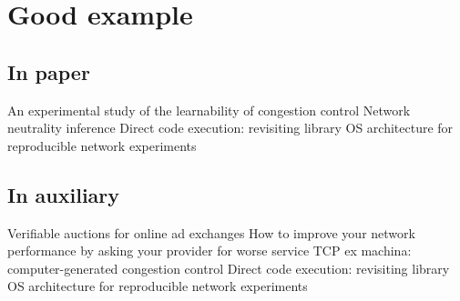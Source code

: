 \documentclass[a4paper]{SIGCOMM}
\begin{document}
\section{Good example}

\subsection{In paper}
An experimental study of the learnability of congestion control
Network neutrality inference
Direct code execution: revisiting library OS architecture for reproducible network experiments

\subsection{In auxiliary}
Verifiable auctions for online ad exchanges
How to improve your network performance by asking your provider for worse service
TCP ex machina: computer-generated congestion control
Direct code execution: revisiting library OS architecture for reproducible network experiments
\end{document}

